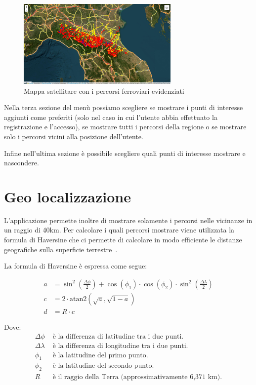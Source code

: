 \begin{figure}[h]
\begin{center}                      
\includegraphics[width=0.7\textwidth]{images/Railway.jpg}
\caption[Mappa satellitare con i percorsi ferroviari evidenziati]{Mappa satellitare con i percorsi ferroviari evidenziati}\label{fig:railway}
\end{center}
\end{figure}

Nella terza sezione del menù possiamo scegliere se mostrare i punti di interesse aggiunti come preferiti (solo nel caso in cui l'utente abbia effettuato la registrazione e l'accesso), se mostrare tutti i percorsi della regione o se mostrare solo i percorsi vicini alla posizione dell'utente.

Infine nell'ultima sezione è possibile scegliere quali punti di interesse mostrare e nascondere.

\section{Geo localizzazione}

L'applicazione permette inoltre di mostrare solamente i  percorsi nelle vicinanze in un raggio di 40km. Per calcolare i quali percorsi mostrare viene utilizzata la formula di Haversine che ci permette di calcolare in modo efficiente le distanze geografiche sulla superficie terrestre~\cite{Haversine}.

La formula di Haversine è espressa come segue:

\begin{align*}
a &= \sin^2\left(\frac{\Delta\phi}{2}\right) + \cos(\phi_1) \cdot \cos(\phi_2) \cdot \sin^2\left(\frac{\Delta\lambda}{2}\right) \\
c &= 2 \cdot \text{atan2}\left(\sqrt{a}, \sqrt{1-a}\right) \\
d &= R \cdot c
\end{align*}

Dove:
\begin{align*}
\Delta\phi & \text{ è la differenza di latitudine tra i due punti.} \\
\Delta\lambda & \text{ è la differenza di longitudine tra i due punti.} \\
\phi_1 & \text{ è la latitudine del primo punto.} \\
\phi_2 & \text{ è la latitudine del secondo punto.} \\
R & \text{ è il raggio della Terra (approssimativamente 6,371 km).}
\end{align*}

